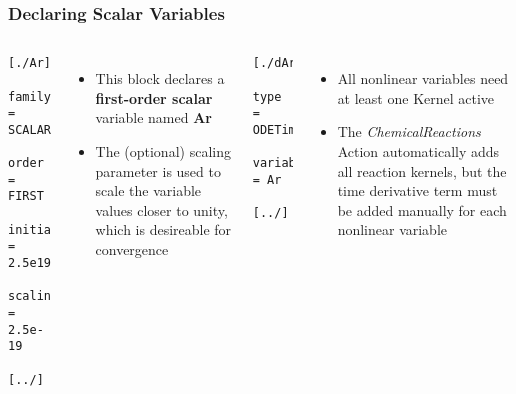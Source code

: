 \begin{frame}[fragile]
	\frametitle{Declaring Scalar Variables}
	\begin{columns}
	\begin{Verbatim}[fontsize=\scriptsize]
    [./Ar]
      family = SCALAR
      order = FIRST
      initial_condition = 2.5e19
      scaling = 2.5e-19
    [../]
	\end{Verbatim}
	\begin{itemize}
		\item This block declares a \textbf{first-order scalar} variable named \textbf{Ar}
		\item The (optional) scaling parameter is used to scale the variable values closer to unity, which is desireable for convergence
	\end{itemize}

	\begin{Verbatim}[fontsize=\scriptsize]
    [./dAr_dt]
      type = ODETimeDerivative
      variable = Ar
    [../]
    
	\end{Verbatim}
	\begin{itemize}
		\item All nonlinear variables need at least one Kernel active
		\item The \textit{ChemicalReactions} Action automatically adds all reaction kernels, but the time derivative term must be added manually for each nonlinear variable
	\end{itemize}
	\end{columns}
\end{frame}


